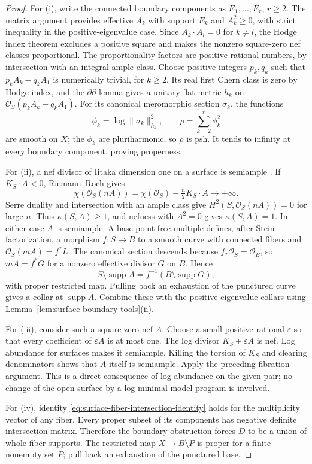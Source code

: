 \documentclass[11pt]{amsart}
\theoremstyle{definition}
\theoremstyle{remark}
\numberwithin{equation}{section}
\newcommand{\OO}{\mathcal O}
\newcommand{\supp}{\operatorname{supp}}
\begin{document}
\begin{proof}
For \textup{(i)}, write the connected boundary components as
$E_1,\ldots,E_r$, $r\ge2$. The matrix argument provides effective
$A_k$ with support $E_k$ and $A_k^2\ge0$, with strict inequality in
the positive-eigenvalue case. Since $A_k\cdot A_l=0$ for $k\ne l$,
the Hodge index theorem excludes a positive square and makes the
nonzero square-zero nef classes proportional. The proportionality
factors are positive rational numbers, by intersection with an
integral ample class. Choose positive integers $p_k,q_k$ such that
$p_kA_k-q_kA_1$ is numerically trivial, for $k\ge2$. Its real first
Chern class is zero by Hodge index, and the $\partial\bar\partial$-lemma
gives a unitary flat metric $h_k$ on
$\OO_S(p_kA_k-q_kA_1)$. For its canonical meromorphic section
$\sigma_k$, the functions
\[
 \phi_k=\log\|\sigma_k\|_{h_k}^2,\qquad
 \rho=\sum_{k=2}^r\phi_k^2
\]
are smooth on $X$; the $\phi_k$ are pluriharmonic, so $\rho$ is psh.
It tends to infinity at every boundary component, proving properness.

For \textup{(ii)}, a nef divisor of Iitaka dimension one on a surface
is semiample \cite[Lemma~7.3]{Fujino2021}. If $K_S\cdot A<0$,
Riemann--Roch gives
\[
 \chi(\OO_S(nA))=\chi(\OO_S)-\tfrac n2K_S\cdot A\longrightarrow+\infty.
\]
Serre duality and intersection with an ample class give
$H^2(S,\OO_S(nA))=0$ for large $n$. Thus $\kappa(S,A)\ge1$, and
nefness with $A^2=0$ gives $\kappa(S,A)=1$. In either case $A$ is
semiample. A base-point-free multiple defines, after Stein
factorization, a morphism $f:S\to B$ to a smooth curve with connected
fibers and $\OO_S(mA)=f^*L$. The canonical section descends because
$f_*\OO_S=\OO_B$, so $mA=f^*G$ for a nonzero effective divisor $G$
on $B$. Hence
\[
 S\setminus\supp A=f^{-1}(B\setminus\supp G),
\]
with proper restricted map. Pulling back an exhaustion of the
punctured curve gives a collar at $\supp A$. Combine these with the
positive-eigenvalue collars using
Lemma~\ref{lem:surface-boundary-tools}\textup{(ii)}.

For \textup{(iii)}, consider such a square-zero nef $A$. Choose a
small positive rational $\varepsilon$ so that every coefficient of
$\varepsilon A$ is at most one. The log divisor
$K_S+\varepsilon A$ is nef. Log abundance for surfaces
\cite[Theorem~6.1]{Fujino2012} makes it semiample. Killing the torsion
of $K_S$ and clearing denominators shows that $A$ itself is semiample.
Apply the preceding fibration argument. This is a direct consequence
of log abundance on the given pair; no change of the open surface by
a log minimal model program is involved.

For \textup{(iv)}, identity
\eqref{eq:surface-fiber-intersection-identity} holds for the
multiplicity vector of any fiber. Every proper subset of its
components has negative definite intersection matrix. Therefore the
boundary obstruction forces $D$ to be a union of whole fiber supports.
The restricted map $X\to B\setminus P$ is proper for a finite nonempty
set $P$; pull back an exhaustion of the punctured base.
\end{proof}
\end{document}
